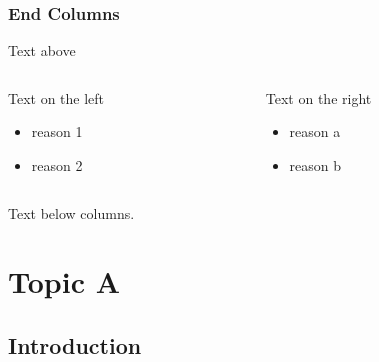 \begin{frame}[fragile]
\frametitle{End Columns}
Text above



\vspace{0.05\textwidth}



\begin{columns}

\begin{column}{0.5\textwidth}



Text on the left


\begin{itemize}
  \item reason 1


  \item reason 2


\end{itemize}
\end{column}

\begin{column}{0.5\textwidth}



Text on the right


\begin{itemize}
  \item reason a


  \item reason b


\end{itemize}
\end{column}
\end{columns}




\vspace{0.05\textwidth}



Text below columns.


\end{frame}
\section{Topic A}
\frame{\tableofcontents[sectionstyle=show/show,subsectionstyle=show/show/hide]}
\frame{\tableofcontents[sectionstyle=show/hide,subsectionstyle=show/show/hide]}
\subsection{Introduction}
\frame{\tableofcontents[sectionstyle=show/hide,subsectionstyle=show/shaded/hide]}

